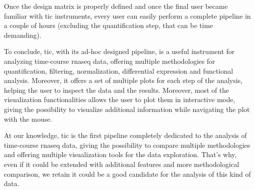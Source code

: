 Once the design matrix is properly defined and once the final user became familiar with \gls{tic} instruments, every user can easily perform a complete pipeline in a couple of hours (excluding the quantification step, that can be time demanding).

To conclude, \gls{tic}, with its ad-hoc designed pipeline, is a useful instrument for analyzing time-course \gls{rnaseq} data, offering multiple methodologies for quantification, filtering, normalization, differential expression and functional analysis.
Moreover, it offers a set of multiple plots for each step of the analysis, helping the user to inspect the data and the results.
Moreover, most of the visualization functionalities allows the user to plot them in interactive mode, giving the possibility to visualize additional information while navigating the plot with the mouse.

At our knowledge, \gls{tic} is the first pipeline completely dedicated to the analysis of time-course \gls{rnaseq} data, giving the possibility to compare multiple methodologies and offering multiple visualization tools for the data exploration.
That's why, even if it could be extended with additional features and more methodological comparison, we retain it could be a good candidate for the analysis of this kind of data.


